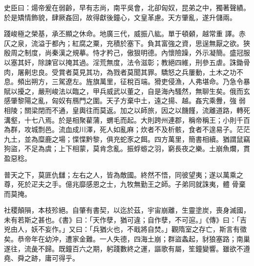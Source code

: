 \begin{pinyinscope}
 史臣曰：煬帝爰在弱齡，早有志尚，南平吳會，北卻匈奴，昆弟之中，獨著聲績。於是矯情飾貌，肆厥姦回，故得獻後鐘心，文皇革慮。天方肇亂，遂升儲兩。



 踐峻極之榮基，承丕顯之休命。地廣三代，威振八紘。單于頓顙，越常重
 譯。赤仄之泉，流溢于都內；紅腐之粟，充積於塞下。負其富強之資，思逞無厭之欲。狹殷周之制度，尚秦漢之規摹。恃才矜己，傲狠明德。內懷險躁，外示凝簡。盛冠服以塞其奸，除諫官以掩其過。淫荒無度，法令滋彰；教絕四維，刑參五虐。誅鋤骨肉，屠劓忠良。受賞者莫見其功，為戮者莫聞其罪。驕怒之兵屢動，土木之功不息。頻出朔方，三駕遼左。旌旗萬里，征稅百端。猾吏侵漁，人弗堪命。乃急令暴賦以擾之，嚴刑峻法以臨之，甲兵威武以董之，自是海內騷然，無聊生矣。俄而玄感肇黎陽之亂，匈奴有鴈門之圍。天子方棄中土，遠之揚、越。姦宄乘釁，強
 弱相陵；關梁閉而不通，皇輿往而莫返。加之以師旅，因之以饑饉，流離道路，轉死溝壑，十七八焉。於是相聚雚蒲，蝟毛而起。大則跨州連郡，稱帝稱王；小則千百為群，攻城剽邑。流血成川澤，死人如亂麻；炊者不及析骸，食者不遑易子。茫茫九土，並為糜鹿之場；惵惵黔黎，俱充蛇豕之餌。四方萬里，簡書相續。猶謂鼠竊狗盜，不足為虞；上下相蒙，莫肯念亂。振蜉蝣之羽，窮長夜之樂。土崩魚爛，貫盈惡稔。



 普天之下，莫匪仇讎；左右之人，皆為敵國。終然不悟，同彼望夷；遂以萬乘之尊，死於疋夫之手。億兆靡感恩之士，九牧無勤王之師。子弟同就誅夷，體
 骨棄而莫掩。



 社稷顛隕，本枝殄絕。自肇有書契，以迄於茲，宇宙崩離，生靈塗炭，喪身滅國，未有若斯之甚也。《書》曰：「天作孽，猶可違；自作孽，不可逭。」《傳》曰：「吉兇由人，妖不妄作。」又曰：「兵猶火也，不戢將自焚。」觀隋室之存亡，斯言有徵矣。恭帝年在幼沖，遭家金難。一人失德，四海土崩；群盜螽起，豺狼塞路；南巢遂往，流彘不歸。既鐘百六之期，躬踐數終之運，謳歌有屬，笙鐘變響。雖欲不遵堯、舜之跡，庸可得乎。



\end{pinyinscope}